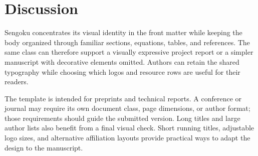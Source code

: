\section{Discussion}
\label{sec:discussion}

Sengoku concentrates its visual identity in the front matter while keeping the body organized through familiar sections, equations, tables, and references. The same class can therefore support a visually expressive project report or a simpler manuscript with decorative elements omitted. Authors can retain the shared typography while choosing which logos and resource rows are useful for their readers.

The template is intended for preprints and technical reports. A conference or journal may require its own document class, page dimensions, or author format; those requirements should guide the submitted version. Long titles and large author lists also benefit from a final visual check. Short running titles, adjustable logo sizes, and alternative affiliation layouts provide practical ways to adapt the design to the manuscript.

